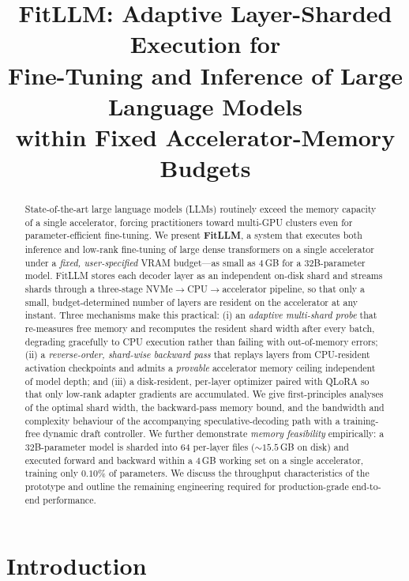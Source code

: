 \documentclass{article}
\title{FitLLM: Adaptive Layer-Sharded Execution for\\ Fine-Tuning and Inference of Large Language Models\\ within Fixed Accelerator-Memory Budgets}
\author{}
\begin{document}
\maketitle

\begin{abstract}
State-of-the-art large language models (LLMs) routinely exceed the memory
capacity of a single accelerator, forcing practitioners toward multi-GPU
clusters even for parameter-efficient fine-tuning. We present \textbf{FitLLM},
a system that executes both inference and low-rank fine-tuning of large dense
transformers on a single accelerator under a \emph{fixed, user-specified}
VRAM budget---as small as $4$\,GB for a $32$B-parameter model. FitLLM stores
each decoder layer as an independent on-disk shard and streams shards through a
three-stage \mbox{NVMe$\rightarrow$CPU$\rightarrow$accelerator} pipeline, so
that only a small, budget-determined number of layers are resident on the
accelerator at any instant. Three mechanisms make this practical: (i) an
\emph{adaptive multi-shard probe} that re-measures free memory and recomputes
the resident shard width after every batch, degrading gracefully to CPU
execution rather than failing with out-of-memory errors; (ii) a
\emph{reverse-order, shard-wise backward pass} that replays layers from
CPU-resident activation checkpoints and admits a \emph{provable} accelerator
memory ceiling independent of model depth; and (iii) a disk-resident,
per-layer optimizer paired with QLoRA so that only low-rank adapter gradients
are accumulated. We give first-principles analyses of the optimal shard width,
the backward-pass memory bound, and the bandwidth and complexity behaviour of
the accompanying speculative-decoding path with a training-free dynamic draft
controller. We further demonstrate \emph{memory feasibility} empirically: a
$32$B-parameter model is sharded into $64$ per-layer files
($\sim$$15.5$\,GB on disk) and executed forward and backward within a $4$\,GB
working set on a single accelerator, training only $0.10\%$ of parameters.
We discuss the throughput characteristics of the prototype and outline the
remaining engineering required for production-grade end-to-end performance.
\end{abstract}


\section{Introduction}
\label{sec:intro}
\end{document}
